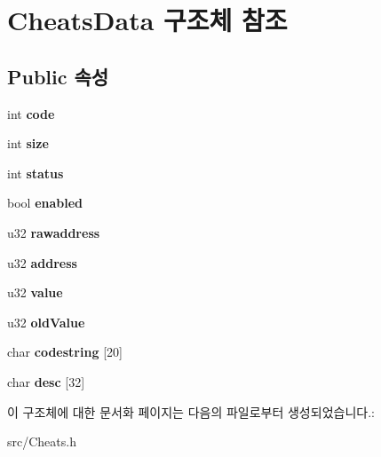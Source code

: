\hypertarget{struct_cheats_data}{}\section{Cheats\+Data 구조체 참조}
\label{struct_cheats_data}
\subsection*{Public 속성}
\begin{DoxyCompactItemize}
\item 
\mbox{\label{struct_cheats_data_a24cc3911cdbf485ce42b401873e2e269}} 
int {\bfseries code}
\item 
\mbox{\label{struct_cheats_data_a2e3e50db1415e980fe34da90fdbda02a}} 
int {\bfseries size}
\item 
\mbox{\label{struct_cheats_data_aeb36cfefe89db53cdb45909d35b9c6e4}} 
int {\bfseries status}
\item 
\mbox{\label{struct_cheats_data_a99c72fc2074645888a5afe88cfb0fd15}} 
bool {\bfseries enabled}
\item 
\mbox{\label{struct_cheats_data_aa12c1d606385a21c544022d5acb9c95e}} 
u32 {\bfseries rawaddress}
\item 
\mbox{\label{struct_cheats_data_a01fd4bf820cf8cb6a4212183b29530cd}} 
u32 {\bfseries address}
\item 
\mbox{\label{struct_cheats_data_ab0df909850861e6314b1abb13c6305d1}} 
u32 {\bfseries value}
\item 
\mbox{\label{struct_cheats_data_ae53ec4ba23eb94b339cc05b807a944d5}} 
u32 {\bfseries old\+Value}
\item 
\mbox{\label{struct_cheats_data_a4163c46e82595675cedca34ad19d6f43}} 
char {\bfseries codestring} \mbox{[}20\mbox{]}
\item 
\mbox{\label{struct_cheats_data_a12223e792c360411d694a8e2506dc90e}} 
char {\bfseries desc} \mbox{[}32\mbox{]}
\end{DoxyCompactItemize}


이 구조체에 대한 문서화 페이지는 다음의 파일로부터 생성되었습니다.\+:\begin{DoxyCompactItemize}
\item 
src/Cheats.\+h\end{DoxyCompactItemize}
